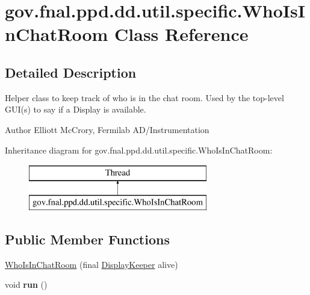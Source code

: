 \hypertarget{classgov_1_1fnal_1_1ppd_1_1dd_1_1util_1_1specific_1_1WhoIsInChatRoom}{\section{gov.\-fnal.\-ppd.\-dd.\-util.\-specific.\-Who\-Is\-In\-Chat\-Room Class Reference}
\label{classgov_1_1fnal_1_1ppd_1_1dd_1_1util_1_1specific_1_1WhoIsInChatRoom}
}


\subsection{Detailed Description}
Helper class to keep track of who is in the chat room. Used by the top-\/level G\-U\-I(s) to say if a Display is available.

\begin{DoxyAuthor}{Author}
Elliott Mc\-Crory, Fermilab A\-D/\-Instrumentation 
\end{DoxyAuthor}
Inheritance diagram for gov.\-fnal.\-ppd.\-dd.\-util.\-specific.\-Who\-Is\-In\-Chat\-Room\-:\begin{figure}[H]
\begin{center}
\leavevmode
\includegraphics[height=2.000000cm]{classgov_1_1fnal_1_1ppd_1_1dd_1_1util_1_1specific_1_1WhoIsInChatRoom}
\end{center}
\end{figure}
\subsection*{Public Member Functions}
\begin{DoxyCompactItemize}
\item 
\hyperlink{classgov_1_1fnal_1_1ppd_1_1dd_1_1util_1_1specific_1_1WhoIsInChatRoom_a19e19a59cf8c3dbc8cec68513b4ee5fb}{Who\-Is\-In\-Chat\-Room} (final \hyperlink{interfacegov_1_1fnal_1_1ppd_1_1dd_1_1interfaces_1_1DisplayKeeper}{Display\-Keeper} alive)
\item 
\hypertarget{classgov_1_1fnal_1_1ppd_1_1dd_1_1util_1_1specific_1_1WhoIsInChatRoom_a43d765c0c8750b5f9a9f2028a4c282bc}{void {\bfseries run} ()}\label{classgov_1_1fnal_1_1ppd_1_1dd_1_1util_1_1specific_1_1WhoIsInChatRoom_a43d765c0c8750b5f9a9f2028a4c282bc}

\end{DoxyCompactItemize}


